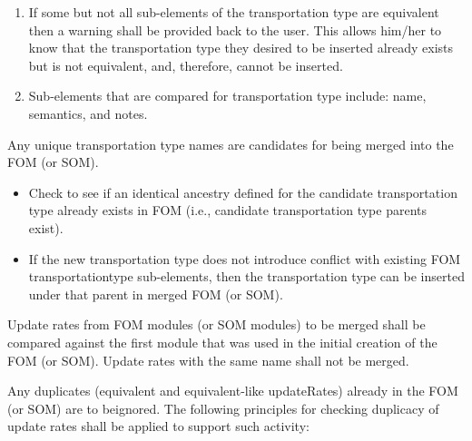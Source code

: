 \newpage
\begingroup
\annexcbodyfont
\setlength{\parskip}{12pt plus 1pt minus 1pt}
\begin{enumerate}[start=3,leftmargin=52pt,labelsep=12pt,label=\arabic*),itemsep=0pt,topsep=0pt,partopsep=0pt,parsep=0pt]
\item If some but not all sub-elements of the transportation type are equivalent then a warning shall be provided back to the user. This allows him/her to know that the transportation type they desired to be inserted already exists but is not equivalent, and, therefore, cannot be inserted.
\item Sub-elements that are compared for transportation type include: name, semantics, and notes.
\end{enumerate}

Any unique transportation type names are candidates for being merged into the FOM (or SOM).

\begin{itemize}[leftmargin=54pt,labelsep=12pt,itemsep=0pt,topsep=-2pt,partopsep=0pt,parsep=0pt]
\item Check to see if an identical ancestry defined for the candidate transportation type already exists in FOM (i.e., candidate transportation type parents exist).
\item If the new transportation type does not introduce conflict with existing FOM transportation\linebreak type sub-elements, then the transportation type can be inserted under that parent in merged FOM (or SOM).
\end{itemize}

\vspace{5.5pt}
Update rates from FOM modules (or SOM modules) to be merged shall be compared against the first module that was used in the initial creation of the FOM (or SOM). Update rates with the same name shall not be merged.

Any duplicates (equivalent and equivalent-like updateRates) already in the FOM (or SOM) are to be\linebreak ignored. The following principles for checking duplicacy of update rates shall be applied to support such activity:

